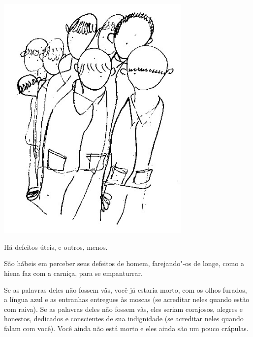 
\pagebreak
\thispagestyle{empty}

\begin{vplace}[.50]
\begin{center}
\includegraphics[width=95mm]{./imgs/Image_10.jpg}
\end{center}
\end{vplace}

\pagebreak

Há defeitos úteis, e outros, menos.

\bigskip
\bigskip

São hábeis em perceber seus defeitos de homem, farejando"-os de longe,
como a hiena faz com a carniça, para se empanturrar.

\bigskip
\bigskip

Se as palavras deles não fossem vãs, você já estaria morto, com os olhos
furados, a língua azul e as entranhas entregues às moscas (se acreditar
neles quando estão com raiva). Se as palavras deles não fossem vãs, eles
seriam corajosos, alegres e honestos, dedicados e conscientes de sua
indignidade (se acreditar neles quando falam com você). Você ainda não
está morto e eles ainda são um pouco crápulas.

\bigskip
\bigskip

